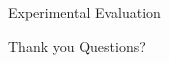 \documentclass[notes, xcolor=dvipsnames]{beamer}
\begin{document}
    \begin{frame}{Experimental Evaluation}

    \end{frame}

    \begin{frame}{Thank you}
        Questions?
    \end{frame}
\end{document}
